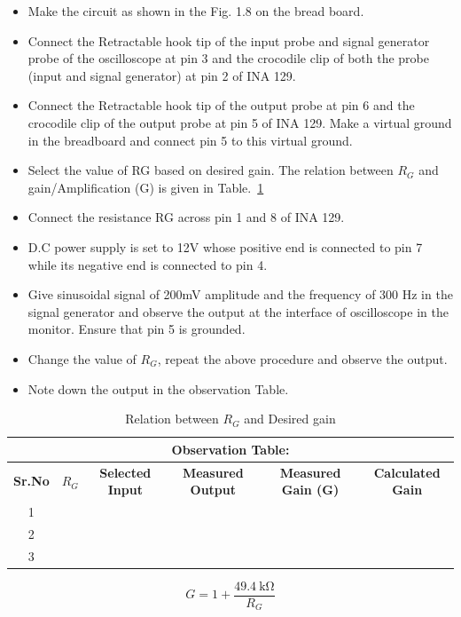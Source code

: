 \documentclass[9pt]{scrreprt}
\begin{document}
\begin{itemize}
\item Make the circuit as shown in the Fig. 1.8 on the bread board.
\item Connect the Retractable hook tip of the input probe and signal generator probe of the oscilloscope at pin 3 and the crocodile clip of both the probe (input and signal generator) at pin 2 of INA 129.
\item Connect the Retractable hook tip of the output probe at pin 6 and the crocodile clip of the output probe at pin 5 of INA 129. Make a virtual ground in the breadboard and connect pin 5 to this virtual ground.
\item Select the value of RG based on desired gain. The relation between $R_G$ and gain/Amplification (G) is given in Table.~\ref{tab:Rc and gain}
\item Connect the resistance RG across pin 1 and 8 of INA 129.
\item D.C power supply is set to 12V whose positive end is connected to pin 7 while its negative end is connected to pin 4.
\item Give sinusoidal signal of 200mV amplitude and the frequency of 300 Hz in the signal generator and observe the output at the interface of oscilloscope in the monitor. Ensure that pin 5 is grounded.
\item Change the value of $R_G$, repeat the above procedure and observe the output.
\item Note down the output in the observation Table.
\end{itemize}

\begin{table}[h!]
\centering
\begin{tabular}{|c|c|c|c|c|c|}
\hline
\multicolumn{6}{|c|}{\textbf{Observation Table:}} \\ \hline
\textbf{Sr.No} & \textbf{$R_G$} & \textbf{Selected Input} & \textbf{Measured Output} & \textbf{Measured Gain (G)} & \textbf{Calculated Gain} \\ \hline
1 & & & & & \\ \hline
2 & & & & & \\ \hline
3 & & & & & \\ \hline
\end{tabular}
\caption{Relation between $R_G$ and Desired gain}
\label{tab:Rc and gain}
\end{table}

\begin{equation*}
    G = 1 + \frac{\SI{49.4}{\kilo\ohm}}{R_G}
\end{equation*}
\end{document}
